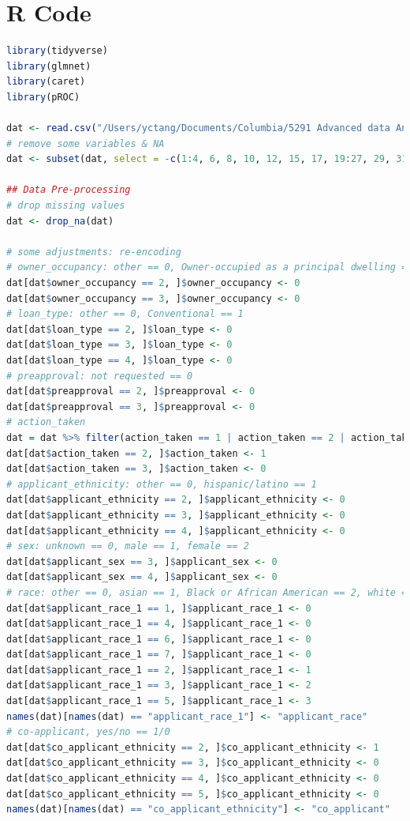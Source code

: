 \documentclass{jpp}
\begin{document}
\clearpage
\section{R Code}\label{code}
\begin{lstlisting}[language=R]
library(tidyverse)
library(glmnet)
library(caret)
library(pROC)

dat <- read.csv("/Users/yctang/Documents/Columbia/5291 Advanced data Analysis/project/data/hmda_2017_ny_all-records_labels.csv")
# remove some variables & NA
dat <- subset(dat, select = -c(1:4, 6, 8, 10, 12, 15, 17, 19:27, 29, 31, 33:50, 51, 53, 54, 56:71, 69:71, 78))

## Data Pre-processing
# drop missing values
dat <- drop_na(dat)

# some adjustments: re-encoding
# owner_occupancy: other == 0, Owner-occupied as a principal dwelling == 1
dat[dat$owner_occupancy == 2, ]$owner_occupancy <- 0
dat[dat$owner_occupancy == 3, ]$owner_occupancy <- 0
# loan_type: other == 0, Conventional == 1
dat[dat$loan_type == 2, ]$loan_type <- 0
dat[dat$loan_type == 3, ]$loan_type <- 0
dat[dat$loan_type == 4, ]$loan_type <- 0
# preapproval: not requested == 0
dat[dat$preapproval == 2, ]$preapproval <- 0
dat[dat$preapproval == 3, ]$preapproval <- 0
# action_taken
dat = dat %>% filter(action_taken == 1 | action_taken == 2 | action_taken == 3)
dat[dat$action_taken == 2, ]$action_taken <- 1
dat[dat$action_taken == 3, ]$action_taken <- 0
# applicant_ethnicity: other == 0, hispanic/latino == 1
dat[dat$applicant_ethnicity == 2, ]$applicant_ethnicity <- 0
dat[dat$applicant_ethnicity == 3, ]$applicant_ethnicity <- 0
dat[dat$applicant_ethnicity == 4, ]$applicant_ethnicity <- 0
# sex: unknown == 0, male == 1, female == 2
dat[dat$applicant_sex == 3, ]$applicant_sex <- 0
dat[dat$applicant_sex == 4, ]$applicant_sex <- 0
# race: other == 0, asian == 1, Black or African American == 2, white == 3
dat[dat$applicant_race_1 == 1, ]$applicant_race_1 <- 0
dat[dat$applicant_race_1 == 4, ]$applicant_race_1 <- 0
dat[dat$applicant_race_1 == 6, ]$applicant_race_1 <- 0
dat[dat$applicant_race_1 == 7, ]$applicant_race_1 <- 0
dat[dat$applicant_race_1 == 2, ]$applicant_race_1 <- 1
dat[dat$applicant_race_1 == 3, ]$applicant_race_1 <- 2
dat[dat$applicant_race_1 == 5, ]$applicant_race_1 <- 3
names(dat)[names(dat) == "applicant_race_1"] <- "applicant_race"
# co-applicant, yes/no == 1/0
dat[dat$co_applicant_ethnicity == 2, ]$co_applicant_ethnicity <- 1
dat[dat$co_applicant_ethnicity == 3, ]$co_applicant_ethnicity <- 0
dat[dat$co_applicant_ethnicity == 4, ]$co_applicant_ethnicity <- 0
dat[dat$co_applicant_ethnicity == 5, ]$co_applicant_ethnicity <- 0
names(dat)[names(dat) == "co_applicant_ethnicity"] <- "co_applicant"


\end{lstlisting}
\end{document}
